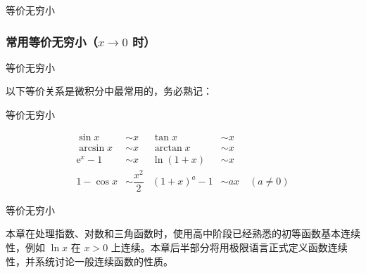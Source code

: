 \documentclass[aspectratio=169,10pt,fontset=fandol]{ctexbeamer}
\newcommand{\ee}{\mathrm{e}}
\begin{document}
\begin{frame}[t,fragile]{等价无穷小}
\footnotesize
{\footnotesize
\subsubsection{\texorpdfstring{常用等价无穷小（\(x \to 0\) 时）}{常用等价无穷小（x 趋于 0 时）}}


}
\end{frame}
\begin{frame}[t,fragile]{等价无穷小}
\footnotesize
{\footnotesize
以下等价关系是微积分中最常用的，务必熟记：


}
\end{frame}
\begin{frame}[t,fragile]{等价无穷小}
\footnotesize
{\footnotesize
\[
\boxed{
\begin{aligned}
\sin x &\sim x & \tan x &\sim x \\
\arcsin x &\sim x & \arctan x &\sim x \\
\ee^x - 1 &\sim x & \ln(1+x) &\sim x \\
1 - \cos x &\sim \dfrac{x^2}{2} & (1+x)^a - 1 &\sim ax \quad (a \neq 0)
\end{aligned}
}
\]


}
\end{frame}
\begin{frame}[t,fragile]{等价无穷小}
\footnotesize
{\footnotesize
本章在处理指数、对数和三角函数时，使用高中阶段已经熟悉的初等函数基本连续性，例如 $\ln x$ 在 $x>0$ 上连续。本章后半部分将用极限语言正式定义函数连续性，并系统讨论一般连续函数的性质。

}
\end{frame}
\end{document}

